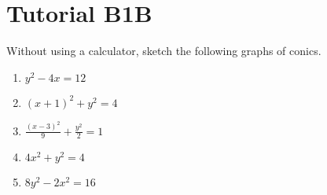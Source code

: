 \section{Tutorial B1B}

\begin{problem}
    Without using a calculator, sketch the following graphs of conics.

    \begin{enumerate}
        \item $y^2-4x=12$
        \item $(x+1)^2+y^2=4$
        \item $\frac{(x-3)^2}{9}+\frac{y^2}{2}=1$
        \item $4x^2+y^2=4$
        \item $8y^2-2x^2=16$
    \end{enumerate}
\end{problem}
